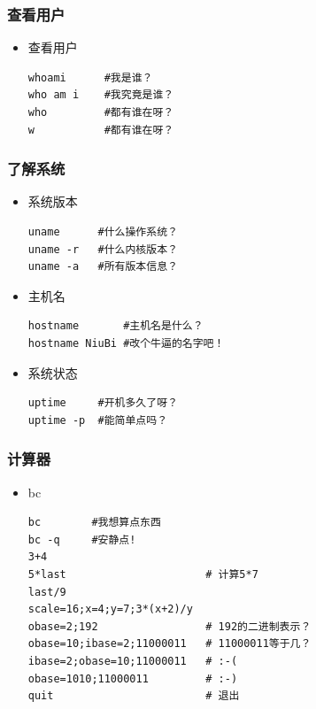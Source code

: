 \documentclass[xcolor=svgnames,presentation]{beamer}
\begin{document}
\begin{frame}[fragile]
\frametitle{查看用户}
\label{sec-4-2-6}
\begin{itemize}

\item 查看用户\\
\label{sec-4-2-6-1}%
\begin{verbatim}
whoami      #我是谁？
who am i    #我究竟是谁？
who         #都有谁在呀？
w           #都有谁在呀？
\end{verbatim}
\end{itemize} %
\end{frame}
\begin{frame}[fragile]
\frametitle{了解系统}
\label{sec-4-2-7}
\begin{itemize}

\item 系统版本\\
\label{sec-4-2-7-1}%
\begin{verbatim}
uname      #什么操作系统？
uname -r   #什么内核版本？
uname -a   #所有版本信息？
\end{verbatim}

\item 主机名\\
\label{sec-4-2-7-2}%
\begin{verbatim}
hostname       #主机名是什么？
hostname NiuBi #改个牛逼的名字吧！
\end{verbatim}

\item 系统状态\\
\label{sec-4-2-7-3}%
\begin{verbatim}
uptime     #开机多久了呀？
uptime -p  #能简单点吗？
\end{verbatim}
\end{itemize} %
\end{frame}
\begin{frame}[fragile]
\frametitle{计算器}
\label{sec-4-2-8}
\begin{itemize}

\item bc\\
\label{sec-4-2-8-1}%
\begin{verbatim}
bc        #我想算点东西
bc -q     #安静点!
3+4
5*last                      # 计算5*7
last/9
scale=16;x=4;y=7;3*(x+2)/y
obase=2;192                 # 192的二进制表示？
obase=10;ibase=2;11000011   # 11000011等于几？
ibase=2;obase=10;11000011   # :-(
obase=1010;11000011         # :-)
quit                        # 退出
\end{verbatim}
\end{itemize} %
\end{frame}
\end{document}
